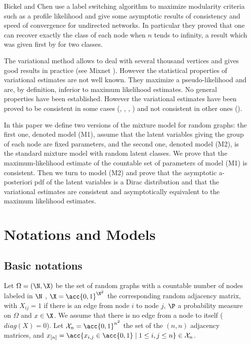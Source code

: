 \documentclass[11pt]{article}
\newcommand{\Xdefn}{\mathcal{X}_{n}}
\newcommand{\xn}{x_{[n]}}
\begin{document}
%
Bickel and Chen \cite{BC} use a label switching algorithm to maximize modularity criteria such as a profile likelihood and give some asymptotic results of consistency and speed of convergence for undirected networks. In particular they proved that one can recover exactly the class of each node when $n$ tends to infinity, a result which was given first by \cite{SN} for two classes.


%
The variational method allows to deal with several thousand vertices and gives good results in practice (see Mixnet \cite{Mixnet}).
%
However the statistical properties of variational estimates are not well known.  They maximize a pseudo-likelihood and are, by definition, inferior to maximum likelihood estimates.
%
No general properties have been established. However the variational estimates have been proved to be consistent in some cases (\cite{HHT}, \cite{HT}, \cite{CM}, \cite{WB}) and not consistent in other ones (\cite{WT}).

In this paper we define two versions of the mixture model for random graphs: the first one, denoted model (M1), assume that the latent variables giving the group of each node are fixed parameters, and the second one, denoted model (M2), is the standard mixture model with random latent classes. We prove that the maximum-likelihood estimate of the countable set of parameters of model (M1) is consistent. Then we turn to model (M2) and prove that the asymptotic a-posteriori pdf of the latent variables is a Dirac distribution and that the variational estimates are consistent and asymptotically equivalent to the maximum likelihood estimates.





\section{Notations and Models}
\label{sec.notation}


\subsection{Basic notations}
Let $\Omega=(\N,\X)$ be the set of random graphs with a countable number of nodes labeled in $\N$ , $\X=\acc{0,1}^{\N^2}$ the corresponding random adjacency matrix, with $X_{ij}=1$ if there is an edge from node $i$ to node $j$, $\P$ a probability measure on $\Omega$ and  $x \in \X$. We assume that there is no edge from a node to itself ($diag(X)=0$). Let $\Xdefn=\acc{0,1}^{n^2}$ the set of the $(n,n)$ adjacency matrices, and
$\xn=\acc{x_{i,j}\in\acc{0,1}\mid 1\leq i,j\leq n} \in \Xdefn$.
\end{document}
